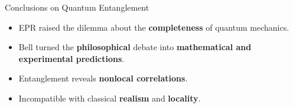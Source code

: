 \begin{frame}{Conclusions on Quantum Entanglement}

\begin{itemize}
  \item EPR raised the dilemma about the \textbf{completeness} of quantum mechanics.
  \pause
  \item Bell turned the \textbf{philosophical} debate into \textbf{mathematical and experimental predictions}.
  \pause

  \item Entanglement reveals \textbf{nonlocal correlations}.
  \pause
  \item Incompatible with classical \textbf{realism} and \textbf{locality}.
\end{itemize}

\end{frame}



